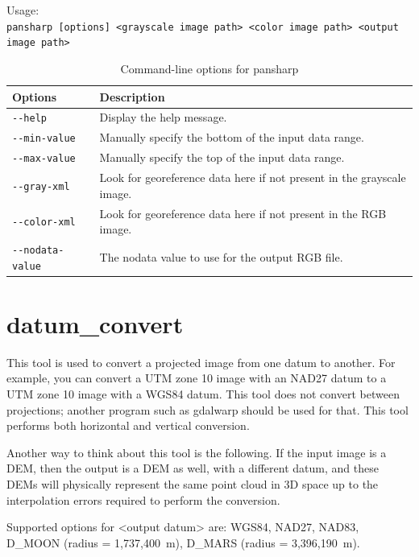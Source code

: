 \medskip

Usage:\\
\hspace*{2em}\texttt{pansharp [options] <grayscale image path> <color image path> <output image path>}

\medskip

\begin{longtable}{|l|p{10cm}|}
\caption{Command-line options for pansharp}
\label{tbl:pansharp}
\endfirsthead
\endhead
\endfoot
\endlastfoot
\hline
Options & Description \\ \hline \hline
\texttt{-\/-help} & Display the help message.\\ \hline
\texttt{-\/-min-value} & Manually specify the bottom of the input data range.\\ \hline
\texttt{-\/-max-value} & Manually specify the top of the input data range.\\ \hline
\texttt{-\/-gray-xml} & Look for georeference data here if not present in the grayscale image.\\ \hline
\texttt{-\/-color-xml} & Look for georeference data here if not present in the RGB image.\\ \hline
\texttt{-\/-nodata-value} & The nodata value to use for the output RGB file.\\ \hline
\end{longtable}

\section{datum\_convert}
\label{datumconvert}

This tool is used to convert a projected image from one datum to another.  For example,
you can convert a UTM zone 10 image with an NAD27 datum to a UTM zone 10 image with a WGS84 datum.
This tool does not convert between projections; another program such as gdalwarp should be used
for that. This tool performs both horizontal and vertical conversion.

Another way to think about this tool is the following. If the input image is a DEM, then the output is a DEM as well, with a different datum, and these DEMs will physically represent the same point cloud in 3D space up to the interpolation errors required to perform the conversion.

Supported options for <output datum> are: WGS84, NAD27, NAD83, D\_MOON (radius = 1,737,400~m), D\_MARS (radius = 3,396,190~m).

\medskip

